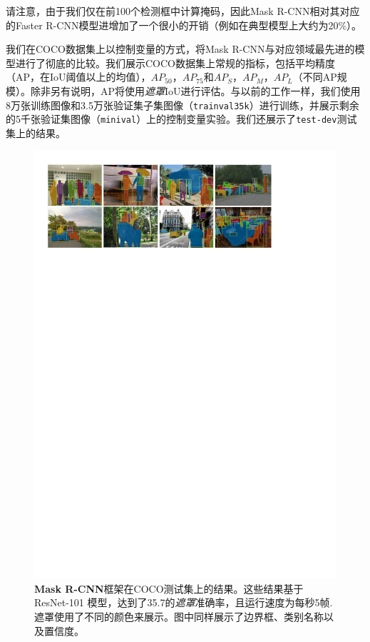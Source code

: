 请注意，由于我们仅在前100个检测框中计算掩码，因此Mask R-CNN相对其对应的Faster R-CNN模型进增加了一个很小的开销（例如在典型模型上大约为20\%）。

\label{sec:results}

我们在COCO数据集上以控制变量的方式，将Mask R-CNN与对应领域最先进的模型进行了彻底的比较。我们展示COCO数据集上常规的指标，包括平均精度（AP，在IoU阈值以上的均值），$AP_{50}$，$AP_{75}$和$AP_S$，$AP_M$，$AP_L$（不同AP规模）。除非另有说明，AP将使用\emph{遮罩}IoU进行评估。与以前的工作一样，我们使用8万张训练图像和3.5万张验证集子集图像（\texttt{trainval35k}）进行训练，并展示剩余的5千张验证集图像（\texttt{minival}）上的控制变量实验。我们还展示了\texttt{test-dev}测试集上的结果。


\begin{figure}[t]
\centering
\includegraphics[width=1\linewidth]{figures/mask_rcnn/results_main}
\caption{\textbf{Mask R-CNN}框架在COCO测试集上的结果。这些结果基于ResNet-101  模型，达到了35.7的\emph{遮罩}准确率，且运行速度为每秒5帧. 遮罩使用了不同的颜色来展示。图中同样展示了边界框、类别名称以及置信度。}
\label{fig:results_main}\vspace{-2mm}
\end{figure}

